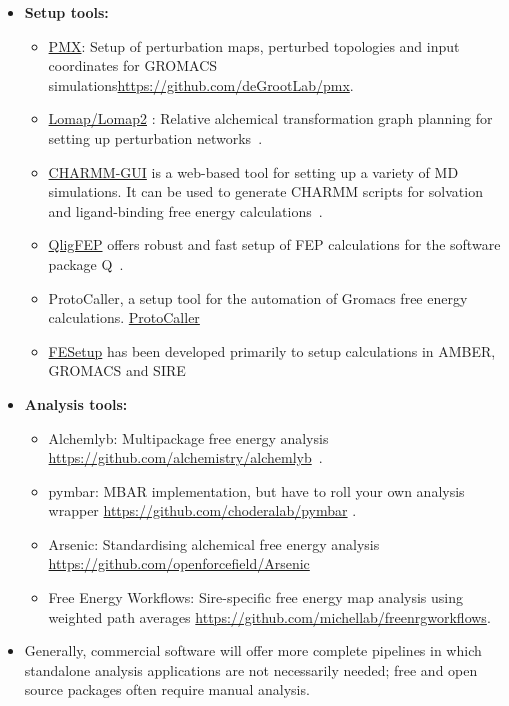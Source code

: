 \documentclass[9pt,bestpractices]{livecoms}
\begin{document}
\begin{itemize}
\begin{itemize}
	\end{itemize}
\item[] \textbf{Setup tools:}
	\begin{itemize}
	\item \href{http://pmx.mpibpc.mpg.de/instructions.html}{PMX}: Setup of perturbation maps, perturbed topologies and input coordinates for GROMACS simulations\url{https://github.com/deGrootLab/pmx}.
	\item \href{https://github.com/MobleyLab/Lomap}{Lomap/Lomap2} : Relative alchemical transformation graph planning for setting up perturbation networks~\cite{liu2013lead}.
	\item \href{http://www.charmm-gui.org/}{CHARMM-GUI} is a web-based tool for setting up a variety of MD simulations. It can be used to generate CHARMM scripts for solvation and ligand-binding free energy calculations~\cite{jo2008charmmgui}.
	\item \href{https://github.com/qusers/qligfep}{QligFEP} offers robust and fast setup of FEP calculations for the software package Q~\cite{jespers2019qligfep}.
	\item ProtoCaller, a setup tool for the automation of Gromacs free energy calculations. \href{https://github.com/protocaller/ProtoCaller}{ProtoCaller}~\cite{suruzhon2020protocaller}
	\item \href{https://fesetup.readthedocs.io/en/latest/introduction.html}{FESetup} has been developed primarily to setup calculations in AMBER, GROMACS and SIRE~\cite{loeffler2015fesetup}
	\end{itemize}
\item []\textbf{Analysis tools:}
	\begin{itemize}

	\item Alchemlyb: Multipackage free energy analysis
	\url{https://github.com/alchemistry/alchemlyb}~\cite{daviddotson2020alchemistry}.
	\item pymbar: MBAR implementation, but have to roll your own analysis wrapper      
	\url{https://github.com/choderalab/pymbar} \cite{shirts2008statisticallya}.
	\item Arsenic: Standardising alchemical free energy analysis \url{https://github.com/openforcefield/Arsenic}
	\item Free Energy Workflows: Sire-specific free energy map analysis using weighted path averages \url{https://github.com/michellab/freenrgworkflows}.
	\end{itemize}
\item[] Generally, commercial software will offer more complete pipelines in which standalone analysis applications are not necessarily needed; free and open source packages often require manual analysis.
\end{itemize}
\end{document}
